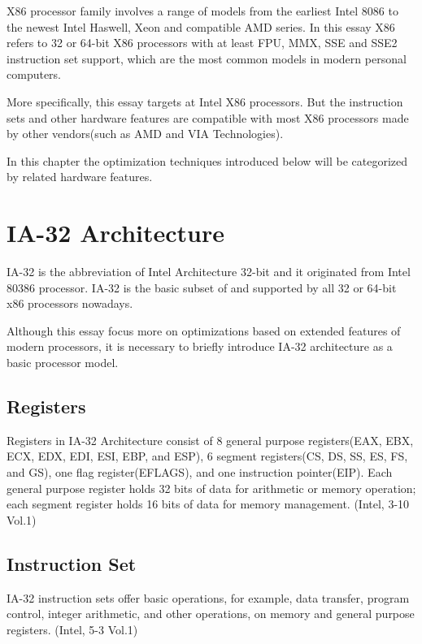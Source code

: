 \documentclass[a4paper]{report}
\begin{document}
	X86 processor family involves a range of models from the earliest Intel 8086 to the newest Intel Haswell, Xeon and compatible AMD series. In this essay X86 refers to 32 or 64-bit X86 processors with at least FPU, MMX, SSE and SSE2 instruction set support, which are the most common models in modern personal computers.
	
	More specifically, this essay targets at Intel X86 processors. But the instruction sets and other hardware features are compatible with most X86 processors made by other vendors(such as AMD and VIA Technologies).
	
	In this chapter the optimization techniques introduced below will be categorized by related hardware features.

\section{IA-32 Architecture} \indent

	IA-32 is the abbreviation of Intel Architecture 32-bit and it originated from Intel 80386 processor. IA-32 is the basic subset of and supported by all 32 or 64-bit x86 processors nowadays.

	Although this essay focus more on optimizations based on extended features of modern processors, it is necessary to briefly introduce IA-32 architecture as a basic processor model.

\subsection{Registers} \indent

	Registers in IA-32 Architecture consist of 8 general purpose registers(EAX, EBX, ECX, EDX, EDI, ESI, EBP, and ESP), 6 segment registers(CS, DS, SS, ES, FS, and GS), one flag register(EFLAGS), and one instruction pointer(EIP). Each general purpose register holds 32 bits of data for arithmetic or memory operation; each segment register holds 16 bits of data for memory management. (Intel, 3-10 Vol.1)

\subsection{Instruction Set} \indent

	IA-32 instruction sets offer basic operations, for example, data transfer, program control, integer arithmetic, and other operations, on memory and general purpose registers. (Intel, 5-3 Vol.1)
	
\end{document}
